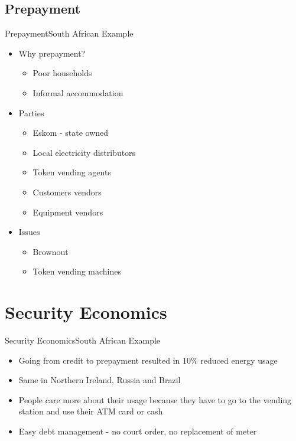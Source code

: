 \documentclass[10pt]{beamer}
\begin{document}
\subsection{Prepayment}
\begin{frame}{Prepayment}{South African Example}
  \begin{itemize}
  	\item Why prepayment?
  	\begin{itemize}
  		\item Poor households
  		\item Informal accommodation
  	\end{itemize}
    \item Parties
    \begin{itemize}
    	\item Eskom - state owned
    	\item Local electricity distributors
    	\item Token vending agents
    	\item Customers vendors
    	\item Equipment vendors
    \end{itemize}
    \item Issues
    \begin{itemize}
    	\item Brownout
    	\item Token vending machines
    \end{itemize}
  \end{itemize}
\end{frame}

\section{Security Economics}
\begin{frame}{Security Economics}{South African Example}
	\begin{itemize}
		\item Going from credit to prepayment resulted in 10\% reduced energy usage
		\item Same in Northern Ireland, Russia and Brazil
		\item People care more about their usage because they have to go to the vending station and use their ATM card or cash
		\item Easy debt management - no court order, no replacement of meter 
	\end{itemize}
\end{frame}
\end{document}
